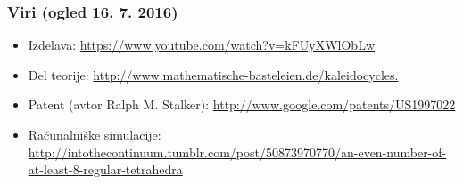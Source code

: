 \documentclass{beamer}
\theoremstyle{plain}
\begin{document}
\begin{frame}
\frametitle{Viri (ogled 16. 7. 2016)}
\begin{itemize}
\item Izdelava: \url{https://www.youtube.com/watch?v=kFUyXWlObLw}
\item Del teorije: \url{http://www.mathematische-basteleien.de/kaleidocycles.}
\item Patent (avtor Ralph M. Stalker): \url{http://www.google.com/patents/US1997022}
\item Računalniške simulacije: \url{http://intothecontinuum.tumblr.com/post/50873970770/an-even-number-of-at-least-8-regular-tetrahedra}
\end{itemize}
\end{frame}
\end{document}
